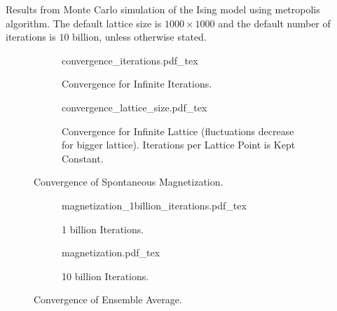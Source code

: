 \documentclass[a4paper, 11pt]{article}
\begin{document}
\vspace*{\fill}
\centering \Large Results from Monte Carlo simulation of the Ising model using metropolis algorithm.
The default lattice size is $1000 \times 1000$ and the default number of iterations is
$10$ billion, unless otherwise stated.
\vspace*{\fill}
\clearpage

\begin{figure}[t]
	\begin{subfigure}{\textwidth}
		\centering
		\def\svgwidth{\columnwidth}
		{convergence_iterations.pdf_tex}
		\caption{Convergence for Infinite Iterations.}
		\vspace{1.5em}
	\end{subfigure}
	\vfill
	\begin{subfigure}{\textwidth}
		\centering
		\def\svgwidth{\columnwidth}
		{convergence_lattice_size.pdf_tex}
		\caption{\centering Convergence for Infinite Lattice (fluctuations decrease for bigger
		         lattice). Iterations per Lattice Point is Kept Constant.}
		\vspace{1em}
	\end{subfigure}
	\caption{Convergence of Spontaneous Magnetization.}
\end{figure}

\begin{figure}[t]
	\begin{subfigure}{\textwidth}
		\centering
		\def\svgwidth{\columnwidth}
		{magnetization_1billion_iterations.pdf_tex}
		\caption{1 billion Iterations.}
		\vspace{1.5em}
	\end{subfigure}
	\vfill
	\begin{subfigure}{\textwidth}
		\centering
		\def\svgwidth{\columnwidth}
		{magnetization.pdf_tex}
		\caption{10 billion Iterations.}
		\vspace{1em}
	\end{subfigure}
	\caption{Convergence of Ensemble Average.}
\end{figure}
\end{document}
